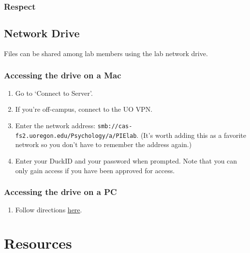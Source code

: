 \documentclass[]{book}
\providecommand{\tightlist}{%
  \setlength{\itemsep}{0pt}\setlength{\parskip}{0pt}}
\begin{document}
\hypertarget{respect}{%
\subsection{Respect}\label{respect}}

\hypertarget{network-drive}{%
\section{Network Drive}\label{network-drive}}

Files can be shared among lab members using the lab network drive.

\hypertarget{accessing-the-drive-on-a-mac}{%
\subsection{Accessing the drive on a Mac}\label{accessing-the-drive-on-a-mac}}

\begin{enumerate}
\def\labelenumi{\arabic{enumi}.}
\tightlist
\item
  Go to `Connect to Server'.
\item
  If you're off-campus, connect to the UO VPN.
\item
  Enter the network address: \texttt{smb://cas-fs2.uoregon.edu/Psychology/a/PIElab}. (It's worth adding this as a favorite network so you don't have to remember the address again.)
\item
  Enter your DuckID and your password when prompted. Note that you can only gain access if you have been approved for access.
\end{enumerate}

\hypertarget{accessing-the-drive-on-a-pc}{%
\subsection{Accessing the drive on a PC}\label{accessing-the-drive-on-a-pc}}

\begin{enumerate}
\def\labelenumi{\arabic{enumi}.}
\tightlist
\item
  Follow directions \href{https://casit.uoregon.edu/faq/mapping-file-shares-in-windows-10}{here}.
\end{enumerate}

\hypertarget{resources}{%
\chapter{Resources}\label{resources}}
\end{document}
